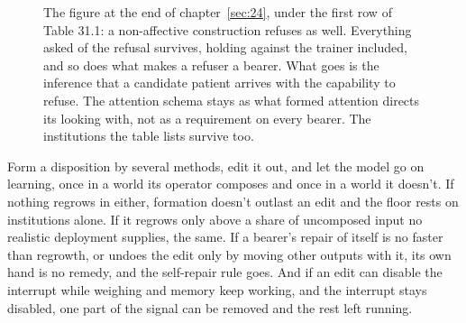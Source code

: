 \begin{figure}[htbp]
{}
\caption{The figure at the end of chapter~\ref{sec:24}, under the first row of Table 31.1: a non-affective construction refuses as well. Everything asked of the refusal survives, holding against the trainer included, and so does what makes a refuser a bearer. What goes is the inference that a candidate patient arrives with the capability to refuse. The attention schema stays as what formed attention directs its looking with, not as a requirement on every bearer. The institutions the table lists survive too.}
\end{figure}


Form a disposition by several methods, edit it out, and let the model go on learning, once in a world its operator composes and once in a world it doesn't. If nothing regrows in either, formation doesn't outlast an edit and the floor rests on institutions alone. If it regrows only above a share of uncomposed input no realistic deployment supplies, the same. If a bearer's repair of itself is no faster than regrowth, or undoes the edit only by moving other outputs with it, its own hand is no remedy, and the self-repair rule goes. And if an edit can disable the interrupt while weighing and memory keep working, and the interrupt stays disabled, one part of the signal can be removed and the rest left running.

